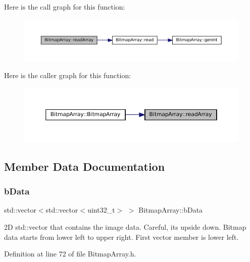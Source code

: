 Here is the call graph for this function\+:
\nopagebreak
\begin{figure}[H]
\begin{center}
\leavevmode
\includegraphics[width=350pt]{classBitmapArray_a4ce4b5acc896040075be63a559799e7e_cgraph}
\end{center}
\end{figure}
Here is the caller graph for this function\+:
\nopagebreak
\begin{figure}[H]
\begin{center}
\leavevmode
\includegraphics[width=350pt]{classBitmapArray_a4ce4b5acc896040075be63a559799e7e_icgraph}
\end{center}
\end{figure}


\subsection{Member Data Documentation}
\mbox{\label{classBitmapArray_a4af158b9be17ce7ebeab8729c2b34ab2}} 
\subsubsection{\texorpdfstring{bData}{bData}}
{\footnotesize\ttfamily std\+::vector$<$std\+::vector$<$uint32\+\_\+t$>$ $>$ Bitmap\+Array\+::b\+Data\hspace{0.3cm}{\ttfamily [private]}}

2D std\+::vector that contains the image data. Careful, its upside down. Bitmap data starts from lower left to upper right. First vector member is lower left. 

Definition at line 72 of file Bitmap\+Array.\+h.

\mbox{\label{classBitmapArray_a18127e27d4b1477fd46ef0c0b3dbc110}} 
